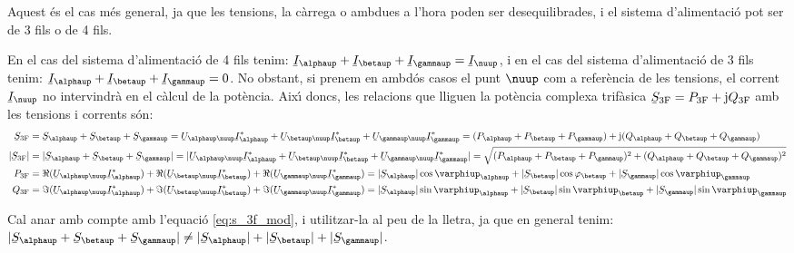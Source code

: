Aquest \'{e}s el cas m\'{e}s general, ja que les tensions, la c\`{a}rrega o
ambdues a l'hora  poden ser desequilibrades, i el sistema
d'alimentaci\'{o} pot ser de 3 fils o de 4 fils.

En el cas del sistema d'alimentaci\'{o} de 4 fils tenim:
$\cmplx{I}_\alphaup+\cmplx{I}_\betaup+\cmplx{I}_\gammaup=\cmplx{I}_\nuup$, i
en el cas del sistema d'alimentaci\'{o} de 3 fils tenim:
$\cmplx{I}_\alphaup+\cmplx{I}_\betaup+\cmplx{I}_\gammaup=0$. No obstant,
si prenem en ambd\'{o}s casos el punt $\nuup$ com a refer\`{e}ncia de les
tensions, el corrent $\cmplx{I}_\nuup$ no intervindr\`{a} en el c\`{a}lcul de
la pot\`{e}ncia. Aix\'{\i} doncs, les relacions que lliguen la pot\`{e}ncia
complexa trif\`{a}sica $\cmplx{S}\ped{3F} = P\ped{3F} + \ju Q\ped{3F}$
amb les tensions i corrents s\'{o}n:
\begin{align}
    \cmplx{S}\ped{3F} &= \cmplx{S}_\alphaup + \cmplx{S}_\betaup + \cmplx{S}_\gammaup =
     \cmplx{U}_{\alphaup\nuup} \cmplx{I}_\alphaup^* +
    \cmplx{U}_{\betaup\nuup} \cmplx{I}_\betaup^* +  \cmplx{U}_{\gammaup\nuup} \cmplx{I}_\gammaup^* =
    (P_\alphaup + P_\betaup + P_\gammaup) + \ju (Q_\alphaup + Q_\betaup + Q_\gammaup) \label{eq:s_3f} \\
    |\cmplx{S}\ped{3F}| &= |\cmplx{S}_\alphaup + \cmplx{S}_\betaup + \cmplx{S}_\gammaup| =
    |\cmplx{U}_{\alphaup\nuup} \cmplx{I}_\alphaup^* +
    \cmplx{U}_{\betaup\nuup} \cmplx{I}_\betaup^* +  \cmplx{U}_{\gammaup\nuup} \cmplx{I}_\gammaup^*| =
    \sqrt{(P_\alphaup + P_\betaup + P_\gammaup)^2 + (Q_\alphaup + Q_\betaup + Q_\gammaup)^2} \label{eq:s_3f_mod} \\
    P\ped{3F} &= \Re(\cmplx{U}_{\alphaup\nuup} \cmplx{I}_\alphaup^*) +
    \Re(\cmplx{U}_{\betaup\nuup} \cmplx{I}_\betaup^*) +  \Re(\cmplx{U}_{\gammaup\nuup}
    \cmplx{I}_\gammaup^*) = |\cmplx{S}_\alphaup| \cos \varphiup_\alphaup + |\cmplx{S}_\betaup| \cos
    \varphi_\betaup + |\cmplx{S}_\gammaup| \cos \varphiup_\gammaup \\
    Q\ped{3F} &= \Im(\cmplx{U}_{\alphaup\nuup} \cmplx{I}_\alphaup^*) +
    \Im(\cmplx{U}_{\betaup\nuup} \cmplx{I}_\betaup^*) +  \Im(\cmplx{U}_{\gammaup\nuup}
    \cmplx{I}_\gammaup^*) = |\cmplx{S}_\alphaup| \sin \varphiup_\alphaup + |\cmplx{S}_\betaup| \sin
    \varphiup_\betaup + |\cmplx{S}_\gammaup| \sin \varphiup_\gammaup
\end{align}

Cal anar amb compte amb l'equaci\'{o} \eqref{eq:s_3f_mod}, i utilitzar-la al
peu de la lletra, ja
que en general tenim: $|\cmplx{S}_\alphaup + \cmplx{S}_\betaup + \cmplx{S}_\gammaup| \neq
|\cmplx{S}_\alphaup| + |\cmplx{S}_\betaup| + |\cmplx{S}_\gammaup|$.

